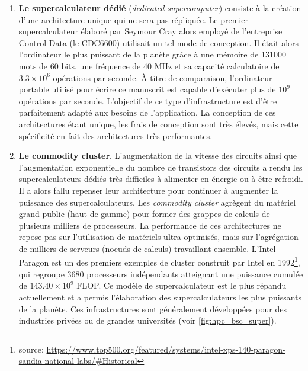    \begin{enumerate}
        \item \textbf{Le supercalculateur dédié} (\textit{dedicated supercomputer}) consiste à la création d'une architecture unique qui ne sera pas répliquée. Le premier supercalculateur élaboré par Seymour Cray alors employé de l'entreprise Control Data (le CDC6600) utilisait un tel mode de conception. Il était alors l'ordinateur le plus puissant de la planète grâce à une mémoire de 131000 mots de 60 bits, une fréquence de 40 MHz et sa capacité calculatoire de $3.3 \times 10^6$ opérations par seconde. À titre de comparaison, l'ordinateur portable utilisé pour écrire ce manuscrit est capable d'exécuter plus de $10^9$ opérations par seconde. L'objectif de ce type d'infrastructure est d'être parfaitement adapté aux besoins de l'application. La conception de ces architectures étant unique, les frais de conception sont très élevés, mais cette spécificité en fait des architectures très performantes. 
        
        \item \textbf{Le commodity cluster}. L'augmentation de la vitesse des circuits ainsi que l'augmentation exponentielle du nombre de transistors des circuits a rendu les supercalculateurs dédiés très difficiles à alimenter en énergie ou à être refroidi. Il a alors fallu repenser leur architecture pour continuer à augmenter la puissance des supercalculateurs. Les \textit{commodity cluster} agrègent du matériel grand public (haut de gamme) pour former des grappes de calculs de plusieurs milliers de processeurs. La performance de ces architectures ne repose pas sur l'utilisation de matériels ultra-optimisés, mais sur l'agrégation de milliers de serveurs (noeuds de calculs) travaillant ensemble. L'Intel Paragon est un des premiers exemples de cluster construit par Intel en 1992\footnote{source: \url{https://www.top500.org/featured/systems/intel-xps-140-paragon-sandia-national-labs/\#Historical}}, qui regroupe 3680 processeurs indépendants atteignant une puissance cumulée de $143.40 \times 10^9$ \gls{FLOP}. Ce modèle de supercalculateur est le plus répandu actuellement et a permis l'élaboration des supercalculateurs les plus puissants de la planète. Ces infrastructures sont généralement développées pour des industries privées ou de grandes universités (voir \autoref{fig:hpc_bsc_super}).
        

\end{enumerate}

